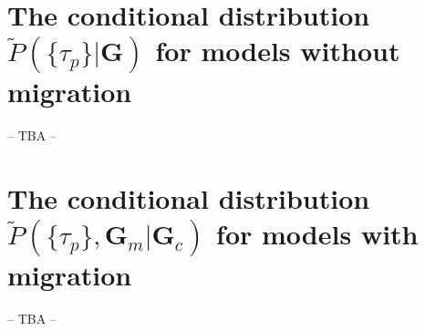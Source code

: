 \documentclass[11pt]{article}
\newcommand{\vect}[1]{\boldsymbol{\mathbf{#1}}}
\newcommand{\G}{\vect{G}}
\newcommand{\Pref}{\widetilde{P}}
\newcommand{\Gc}{\G_c}
\newcommand{\Gm}{\G_m}
\begin{document}
\appendix

\section{\texorpdfstring{The conditional distribution $\Pref(\{\tau_p\}|\G)$ for models without migration}{Conditional distribution without migration}}\label{ap:cond_nomig}

-- TBA --

\section{\texorpdfstring{The conditional distribution  $\Pref(\{\tau_p\},\Gm|\Gc)$ for models with migration}{Conditional distribution with migration}}\label{ap:cond_mig}

-- TBA --
\end{document}
